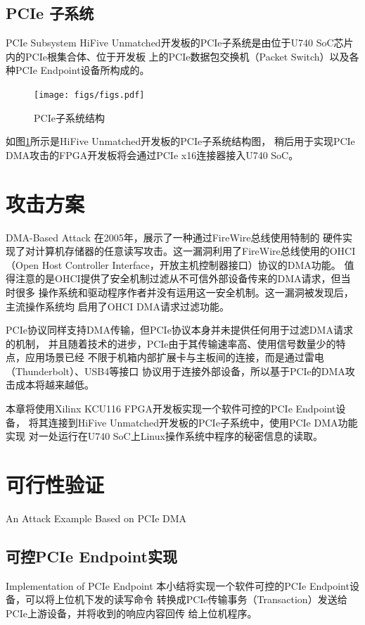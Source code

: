 \subsection{PCIe 子系统}{PCIe Subsystem}
HiFive Unmatched开发板的PCIe子系统是由位于U740 SoC芯片内的PCIe根集合体、位于开发板
上的PCIe数据包交换机（Packet Switch）以及各种PCIe Endpoint设备所构成的。

\begin{figure}[ht]
	\centering
	\texttt{[image: figs/figs.pdf]}
	\caption{PCIe子系统结构}
	\label{fig:unmatched-pcie}
\end{figure}

如图\ref{fig:unmatched-pcie}所示是HiFive Unmatched开发板的PCIe子系统结构图，
稍后用于实现PCIe DMA攻击的FPGA开发板将会通过PCIe x16连接器接入U740 SoC。

\section{攻击方案}{DMA-Based Attack}
在2005年，\citet{becher2005firewire}展示了一种通过FireWire总线使用特制的
硬件实现了对计算机存储器的任意读写攻击。这一漏洞利用了FireWire总线使用的OHCI
（Open Host Controller Interface，开放主机控制器接口）协议的DMA功能。
值得注意的是OHCI提供了安全机制过滤从不可信外部设备传来的DMA请求，但当时很多
操作系统和驱动程序作者并没有运用这一安全机制。这一漏洞被发现后，主流操作系统均
启用了OHCI DMA请求过滤功能。

PCIe协议同样支持DMA传输，但PCIe协议本身并未提供任何用于过滤DMA请求的机制，
并且随着技术的进步，PCIe由于其传输速率高、使用信号数量少的特点，应用场景已经
不限于机箱内部扩展卡与主板间的连接，而是通过雷电（Thunderbolt）、USB4等接口
协议用于连接外部设备，所以基于PCIe的DMA攻击成本将越来越低。

本章将使用Xilinx KCU116 FPGA开发板实现一个软件可控的PCIe Endpoint设备，
将其连接到HiFive Unmatched开发板的PCIe子系统中，使用PCIe DMA功能实现
对一处运行在U740 SoC上Linux操作系统中程序的秘密信息的读取。


\section{可行性验证}{An Attack Example Based on PCIe DMA}
\subsection{可控PCIe Endpoint实现}{Implementation of PCIe Endpoint}
本小结将实现一个软件可控的PCIe Endpoint设备，可以将上位机下发的读写命令
转换成PCIe传输事务（Transaction）发送给PCIe上游设备，并将收到的响应内容回传
给上位机程序。

